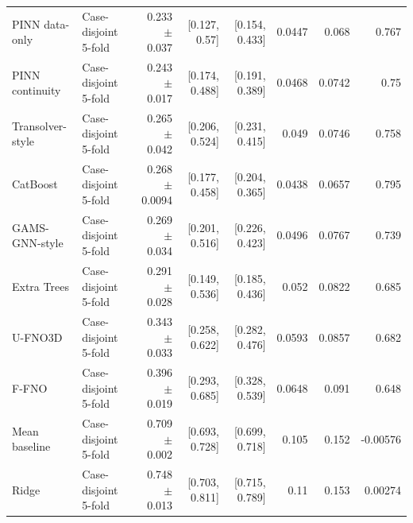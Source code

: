 \begin{landscape}
\begin{longtable}{p{3.8cm}p{2.9cm}rrrrrr}
PINN data-only & Case-disjoint 5-fold & 0.233 $\pm$ 0.037 & [0.127, 0.57] & [0.154, 0.433] & 0.0447 & 0.068 & 0.767 \\
PINN continuity & Case-disjoint 5-fold & 0.243 $\pm$ 0.017 & [0.174, 0.488] & [0.191, 0.389] & 0.0468 & 0.0742 & 0.75 \\
Transolver-style & Case-disjoint 5-fold & 0.265 $\pm$ 0.042 & [0.206, 0.524] & [0.231, 0.415] & 0.049 & 0.0746 & 0.758 \\
CatBoost & Case-disjoint 5-fold & 0.268 $\pm$ 0.0094 & [0.177, 0.458] & [0.204, 0.365] & 0.0438 & 0.0657 & 0.795 \\
GAMS-GNN-style & Case-disjoint 5-fold & 0.269 $\pm$ 0.034 & [0.201, 0.516] & [0.226, 0.423] & 0.0496 & 0.0767 & 0.739 \\
Extra Trees & Case-disjoint 5-fold & 0.291 $\pm$ 0.028 & [0.149, 0.536] & [0.185, 0.436] & 0.052 & 0.0822 & 0.685 \\
U-FNO3D & Case-disjoint 5-fold & 0.343 $\pm$ 0.033 & [0.258, 0.622] & [0.282, 0.476] & 0.0593 & 0.0857 & 0.682 \\
F-FNO & Case-disjoint 5-fold & 0.396 $\pm$ 0.019 & [0.293, 0.685] & [0.328, 0.539] & 0.0648 & 0.091 & 0.648 \\
Mean baseline & Case-disjoint 5-fold & 0.709 $\pm$ 0.002 & [0.693, 0.728] & [0.699, 0.718] & 0.105 & 0.152 & -0.00576 \\
Ridge & Case-disjoint 5-fold & 0.748 $\pm$ 0.013 & [0.703, 0.811] & [0.715, 0.789] & 0.11 & 0.153 & 0.00274 \\
\bottomrule\end{longtable}\end{landscape}

